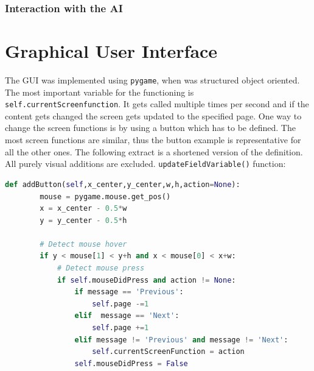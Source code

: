 \documentclass[12pt]{article}
\begin{document}
\subsubsection{Interaction with the AI}
\section{Graphical User Interface}
The GUI was implemented using \lstinline{pygame}, when was structured object oriented. The most important variable for the functioning is \\ \lstinline{self.currentScreenfunction}. It gets called multiple times per second and if the content gets changed the screen gets updated to the specified page. One way to change the screen functions is by using a button which has to be defined. The most screen functions are similar, thus the button example is representative for all the other ones. The following extract is a shortened version of the definition. All purely visual additions are excluded.
\lstinline{updateFieldVariable()} function:
\begin{lstlisting}[language=Python, caption=Example - Definition of the button function]
    def addButton(self,x_center,y_center,w,h,action=None):
        mouse = pygame.mouse.get_pos()
        x = x_center - 0.5*w
        y = y_center - 0.5*h

        # Detect mouse hover
        if y < mouse[1] < y+h and x < mouse[0] < x+w:
            # Detect mouse press
            if self.mouseDidPress and action != None:
                if message == 'Previous': 
                    self.page -=1
                elif  message == 'Next':
                    self.page +=1
                elif message != 'Previous' and message != 'Next':
                    self.currentScreenFunction = action
                self.mouseDidPress = False
\end{lstlisting}
\end{document}
